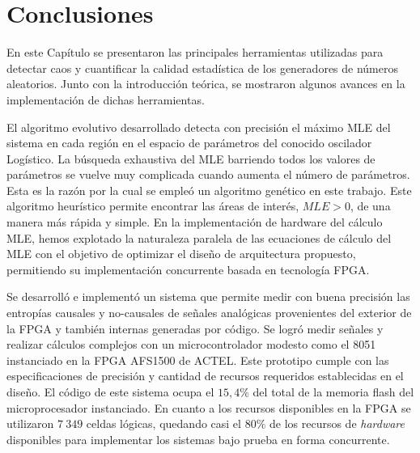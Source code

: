 \section{Conclusiones}

En este Capítulo se presentaron las principales herramientas utilizadas para detectar caos y cuantificar la calidad estadística de los generadores de números aleatorios.
Junto con la introducción teórica, se mostraron algunos avances en la implementación de dichas herramientas.

El algoritmo evolutivo desarrollado detecta con precisión el máximo MLE del sistema en cada región en el espacio de parámetros del conocido oscilador Logístico.
La búsqueda exhaustiva del MLE barriendo todos los valores de parámetros se vuelve muy complicada cuando aumenta el número de parámetros.
Esta es la razón por la cual se empleó un algoritmo genético en este trabajo.
Este algoritmo heurístico permite encontrar las áreas de interés, $ MLE> 0 $, de una manera más rápida y simple.
En la implementación de hardware del cálculo MLE, hemos explotado la naturaleza paralela de las ecuaciones de cálculo del MLE con el objetivo de optimizar el diseño de arquitectura propuesto, permitiendo su implementación concurrente basada en tecnología FPGA.

Se desarrolló e implementó un sistema que permite medir con buena precisión las entropías causales y no-causales de señales analógicas provenientes del exterior de la FPGA y también internas generadas por código.
Se logró medir señales y realizar cálculos complejos con un microcontrolador modesto como el 8051 instanciado en la FPGA AFS1500 de ACTEL.
Este prototipo cumple con las especificaciones de precisión y cantidad de recursos requeridos establecidas en el diseño.
El código de este sistema ocupa el $15,4\%$ del total de la memoria flash del microprocesador instanciado.
En cuanto a los recursos disponibles en la FPGA se utilizaron $7~349$ celdas lógicas, quedando casi el $80\%$ de los recursos de \textit{hardware} disponibles para implementar los sistemas bajo prueba en forma concurrente.

